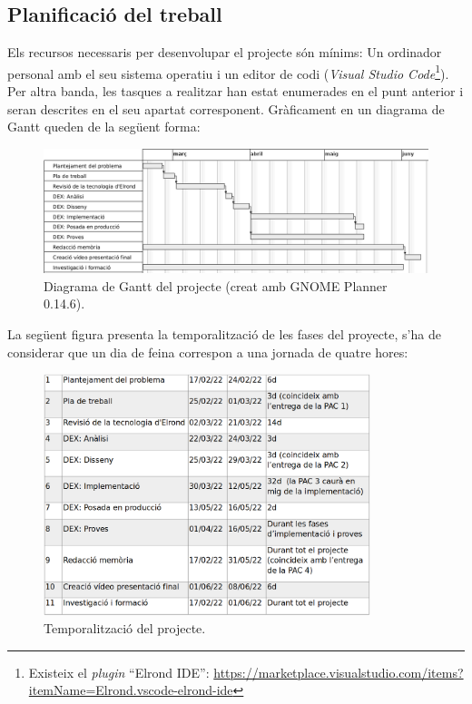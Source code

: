\documentclass[11pt,a4paper]{article}
\begin{document}
\subsection{Planificació del treball}
Els recursos necessaris per desenvolupar el projecte són mínims: Un ordinador personal amb el seu sistema operatiu i un editor de codi (\textit{Visual Studio Code}\footnote{Existeix el \textit{plugin} ``Elrond IDE'': \url{https://marketplace.visualstudio.com/items?itemName=Elrond.vscode-elrond-ide}}). Per altra banda, les tasques a realitzar han estat enumerades en el punt anterior i seran descrites en el seu apartat corresponent. Gràficament en un diagrama de Gantt queden de la següent forma:

\begin{figure}[h]
\includegraphics[width=1\textwidth]{gantt.png}
\centering
\caption{Diagrama de Gantt del projecte (creat amb GNOME Planner 0.14.6).}
\end{figure}

La següent figura presenta la temporalització de les fases del proyecte, s'ha de considerar que un dia de feina correspon a una jornada de quatre hores:
\begin{figure}[h]
\includegraphics[width=0.85\textwidth]{gantttemp.png}
\centering
\caption{Temporalització del projecte.}
\end{figure} 
\end{document}
